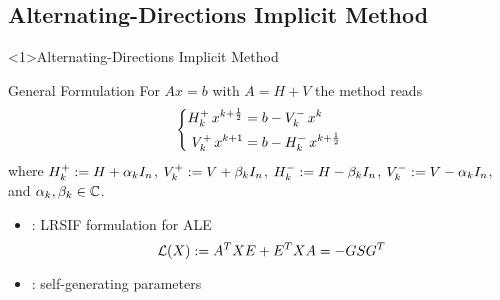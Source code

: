 \subsection{Alternating-Directions Implicit Method}

\begin{frame}<1>{Alternating-Directions Implicit Method}
\begin{bigpicturecols}
  \begin{block}{General Formulation \parencite{Peaceman1955}}
    For $Ax=b$ with $A = H+V$ the method reads
    \begin{equation*}
    \left\{
    \begin{aligned}
      \mathop{H_k^+}  x^{k+\frac{1}{2}} &= b - \mathop{V_k^-} x^k \\
      \mathop{V_k^+} x^{k+1}           &= b - \mathop{H_k^-} x^{k+\frac{1}{2}}
    \end{aligned}
    \right.
    \end{equation*}
    where
    $\mathop{H_k^+}  := H + \alpha_k I_n$,
    $\mathop{V_k^+} := V + \beta_k  I_n$,
    $\mathop{H_k^-}  := H - \beta_k  I_n$,
    $\mathop{V_k^-} := V - \alpha_k I_n$,
    and $\alpha_k, \beta_k\in\mathbb{C}$.
  \end{block}
  \begin{itemize}
    \item
      \cite{Lang2017}: LRSIF formulation for ALE
      \begin{equation*}
        \operatorname{\mathcal L}(X) := A^T X E + E^T X A = -GSG^T
      \end{equation*}
    \item
      \cite{Kuerschner2016}: self-generating parameters
  \end{itemize}
\column{\bigpicturewidth}
\end{bigpicturecols}
\end{frame}
